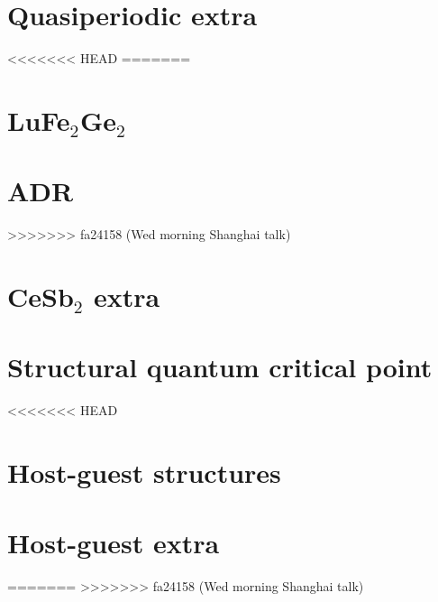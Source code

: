 \section{Quasiperiodic extra}


%
%




<<<<<<< HEAD
=======
\section{LuFe$_2$Ge$_2$}

% 
\section{ADR}

>>>>>>> fa24158 (Wed morning Shanghai talk)

\section{CeSb$_2$ extra}


\section{Structural quantum critical point}


<<<<<<< HEAD

\section{Host-guest structures}

\section{Host-guest extra}


=======
>>>>>>> fa24158 (Wed morning Shanghai talk)


% 


% 
% 

% 


% 


% 




